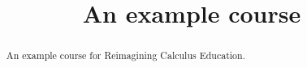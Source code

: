 \documentclass{xourse}
\title{An example course}
\begin{document}
\begin{abstract}
  An example course for Reimagining Calculus Education.
\end{abstract}
\maketitle
{}
\end{document}
